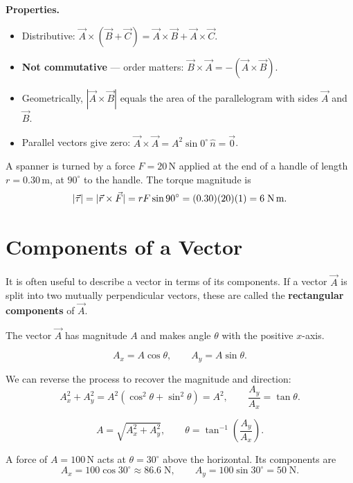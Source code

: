 \textbf{Properties.}
\begin{itemize}
  \item Distributive: $\vec{A}\times(\vec{B}+\vec{C})=\vec{A}\times\vec{B}+\vec{A}\times\vec{C}$.
  \item \textbf{Not commutative} --- order matters: $\vec{B}\times\vec{A}=-(\vec{A}\times\vec{B})$.
  \item Geometrically, $|\vec{A}\times\vec{B}|$ equals the area of the parallelogram with sides $\vec{A}$ and $\vec{B}$.
  \item Parallel vectors give zero: $\vec{A}\times\vec{A}=A^2\sin0^\circ\,\hat{n}=\vec{0}$.
\end{itemize}

\begin{workedexample}[1.4: Torque]
A spanner is turned by a force $F=20$\,N applied at the end of a handle of length $r=0.30$\,m,
at $90^\circ$ to the handle. The torque magnitude is
\[
  |\vec{\tau}| = |\vec{r}\times\vec{F}| = rF\sin90^\circ = (0.30)(20)(1) = 6\;\text{N\,m}.
\]
\end{workedexample}


\section{Components of a Vector}

It is often useful to describe a vector in terms of its components. If a vector $\vec{A}$ is split
into two mutually perpendicular vectors, these are called the \textbf{rectangular components}
of $\vec{A}$.

The vector $\vec{A}$ has magnitude $A$ and makes angle $\theta$ with the positive $x$-axis.

\begin{keybox}
\[
  A_x = A\cos\theta, \qquad A_y = A\sin\theta.
\]
\end{keybox}

We can reverse the process to recover the magnitude and direction:
\[
  A_x^2 + A_y^2 = A^2(\cos^2\theta+\sin^2\theta) = A^2, \qquad
  \frac{A_y}{A_x} = \tan\theta.
\]

\begin{keybox}
\[
  A = \sqrt{A_x^2+A_y^2}, \qquad \theta = \tan^{-1}\!\left(\frac{A_y}{A_x}\right).
\]
\end{keybox}

\begin{workedexample}
A force of $A=100$\,N acts at $\theta=30^\circ$ above the horizontal. Its components are
\[
  A_x = 100\cos30^\circ \approx 86.6\;\text{N}, \qquad A_y = 100\sin30^\circ = 50\;\text{N}.
\]
\end{workedexample}

